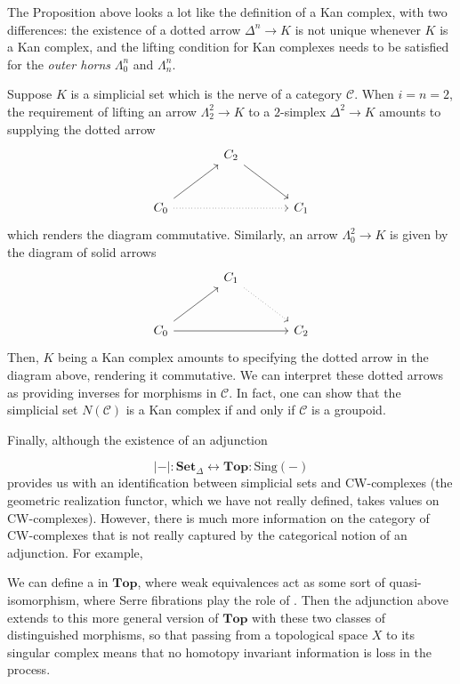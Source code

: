 \documentclass[a4paper,11pt]{article}
\newcommand{\ccal}{\mathcal{C}}
\newcommand{\sets}{\mathbf{Set}}
\newcommand{\topo}{\mathbf{Top}}
\theoremstyle{plain}
\theoremstyle{definition}
\theoremstyle{remark}
\begin{document}
The Proposition above looks a lot like the definition of a Kan complex, with two differences: the existence of a dotted arrow $\Delta^n \to K$ is not unique whenever $K$ is a Kan complex, and the lifting condition for Kan complexes needs to be satisfied for the \textit{outer horns} $\Lambda_0^n$ and $\Lambda_n^n$. 

Suppose $K$ is a simplicial set which is the nerve of a category $\ccal$. When $i = n= 2$, the requirement of lifting an arrow $\Lambda_2^2 \to K$ to a $2$-simplex $\Delta^2 \to K$ amounts to supplying the dotted arrow 
\begin{equation*}
    \begin{tikzcd}[row sep = large, column sep = large]
    & C_2 \arrow[rd]& \\
    C_0 \arrow[ru] \arrow[rr, dotted] & & C_1
    \end{tikzcd}
\end{equation*}
which renders the diagram commutative. Similarly, an arrow $\Lambda_0^2 \to K$ is given by the diagram of solid arrows
\begin{equation*}
    \begin{tikzcd}[row sep = large, column sep = large]
    & C_1 \arrow[rd, dotted] & \\
    C_0 \arrow[rr] \arrow[ru] & & C_2
    \end{tikzcd}
\end{equation*}
Then, $K$ being a Kan complex amounts to specifying the dotted arrow in the diagram above, rendering it commutative. We can interpret these dotted arrows as providing inverses for morphisms in $\ccal$. In fact, one can show that the simplicial set $N(\ccal)$ is a Kan complex if and only if $\ccal$ is a groupoid. 





Finally, although the existence of an adjunction 

$$|-| \colon \sets_{\Delta} \longleftrightarrow \topo \colon \text{Sing}(-)$$
provides us with an identification between simplicial sets and CW-complexes (the geometric realization functor, which we have not really defined, takes values on CW-complexes). However, there is much more information on the category of CW-complexes that is not really captured by the categorical notion of an adjunction. For example,  

We can define a  in $\topo$, where weak equivalences act as some sort of quasi-isomorphism, where Serre fibrations play the role of . Then the adjunction above extends to this more general version of $\topo$ with these two classes of distinguished morphisms, so that passing from a topological space $X$ to its singular complex means that no homotopy invariant information is loss in the process. 
\end{document}
